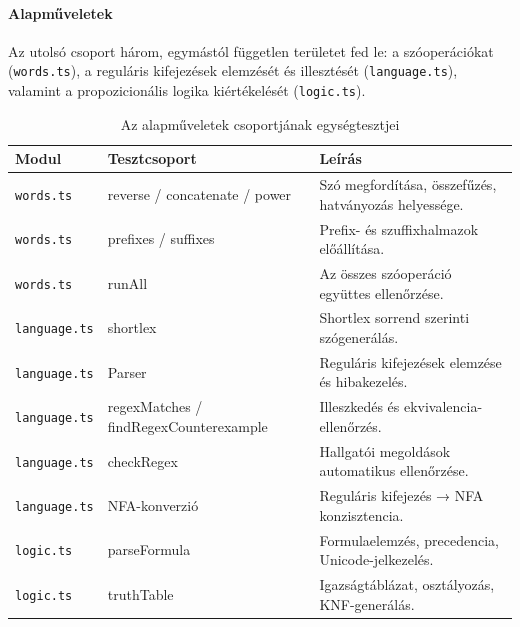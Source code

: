\paragraph{Alapműveletek}
Az utolsó csoport három, egymástól független területet fed le: a szóoperációkat (\texttt{words.ts}), a reguláris kifejezések elemzését és illesztését (\texttt{language.ts}), valamint a propozicionális logika kiértékelését (\texttt{logic.ts}).

\begin{table}[H]
    \centering
    \begin{tabularx}{\textwidth}{|l|l|X|}
        \hline
        \textbf{Modul} & \textbf{Tesztcsoport} & \textbf{Leírás} \\ \hline
        \texttt{words.ts} & reverse / concatenate / power & Szó megfordítása, összefűzés, hatványozás helyessége. \\ \hline
        \texttt{words.ts} & prefixes / suffixes & Prefix- és szuffixhalmazok előállítása. \\ \hline
        \texttt{words.ts} & runAll & Az összes szóoperáció együttes ellenőrzése. \\ \hline
        \texttt{language.ts} & shortlex & Shortlex sorrend szerinti szógenerálás. \\ \hline
        \texttt{language.ts} & Parser & Reguláris kifejezések elemzése és hibakezelés. \\ \hline
        \texttt{language.ts} & regexMatches / findRegexCounterexample & Illeszkedés és ekvivalencia-ellenőrzés. \\ \hline
        \texttt{language.ts} & checkRegex & Hallgatói megoldások automatikus ellenőrzése. \\ \hline
        \texttt{language.ts} & NFA-konverzió & Reguláris kifejezés → NFA konzisztencia. \\ \hline
        \texttt{logic.ts} & parseFormula & Formulaelemzés, precedencia, Unicode-jelkezelés. \\ \hline
        \texttt{logic.ts} & truthTable & Igazságtáblázat, osztályozás, KNF-generálás. \\ \hline
    \end{tabularx}
    \caption{Az alapműveletek csoportjának egységtesztjei}
    \label{tab:test_basic}
\end{table}

